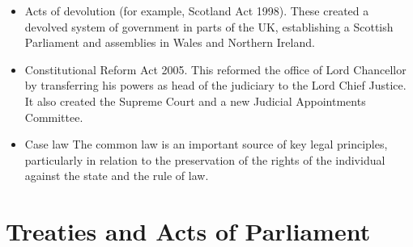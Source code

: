 \documentclass[14pt,titlepage]{extarticle}
\begin{document}
\begin{itemize}
\item Acts of devolution (for example, Scotland Act 1998). These created a devolved system of government in parts of the UK, establishing a Scottish Parliament and assemblies in Wales and Northern Ireland.

\item Constitutional Reform Act 2005. This reformed the office of Lord Chancellor by transferring his powers as head of the judiciary to the Lord Chief Justice. It also created the Supreme Court and a new Judicial Appointments Committee.

\item Case law
The common law is an important source of key legal principles, particularly in relation to the preservation of the rights of the individual against the state and the rule of law.
\end{itemize}

\section{Treaties and Acts of Parliament}\label{ActList}
\end{document}
